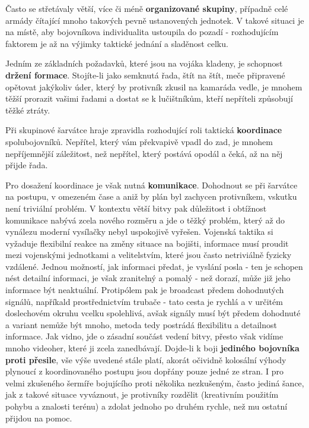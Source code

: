 Často se střetávaly větší, více či méně \textbf{organizované skupiny}, případně celé armády čítající mnoho takových pevně ustanovených jednotek. V takové situaci je na místě, aby bojovníkova individualita ustoupila do pozadí - rozhodujícím faktorem je až na výjimky taktické jednání a sladěnost celku. 

Jedním ze základních požadavků, které jsou na vojáka kladeny, je schopnost \textbf{držení formace}. Stojíte-li jako semknutá řada, štít na štít, meče připravené opětovat jakýkoliv úder, který by protivník zkusil na kamaráda vedle, je mnohem těžší prorazit vašimi řadami a dostat se k lučištníkům, kteří nepříteli způsobují těžké ztráty. 

Při skupinové šarvátce hraje zpravidla rozhodující roli taktická \textbf{koordinace} spolubojovníků. Nepřítel, který vám překvapivě vpadl do zad, je mnohem nepříjemnější záležitost, než nepřítel, který postává opodál a čeká, až na něj přijde řada.  

Pro dosažení koordinace je však nutná \textbf{komunikace}. Dohodnout se při šarvátce na postupu, v omezeném čase a aniž by plán byl zachycen protivníkem, vskutku není triviální problém. V kontextu větší bitvy pak důležitost i obtížnost komunikace nabývá zcela nového rozměru a jde o těžký problém, který až do vynálezu moderní vysílačky nebyl uspokojivě vyřešen. Vojenská taktika si vyžaduje flexibilní reakce na změny situace na bojišti, informace musí proudit mezi vojenskými jednotkami a velitelstvím, které jsou často netriviálně fyzicky vzdálené. Jednou možností, jak informaci předat, je vyslání posla - ten je schopen nést detailní informaci, je však zranitelný a pomalý - než dorazí, může již jeho informace být neaktuální. Protipólem pak je broadcast předem dohodnutých signálů, napříkald prostřednictvím trubače - tato cesta je rychlá a v určitém doslechovém okruhu vcelku spolehlivá, avšak signály musí být předem dohodnuté a variant nemůže být mnoho, metoda tedy postrádá flexibilitu a detailnost informace. Jak vidno, jde o zásadní součást vedení bitvy, přesto však vidíme mnoho videoher, které ji zcela zanedbávají.
\bigbreak
Dojde-li k boji \textbf{jediného bojovníka proti přesile}, vše výše uvedené stále platí, akorát očividně kolosální výhody plynoucí z koordinovaného postupu jsou dopřány pouze jedné ze stran. I pro velmi zkušeného šermíře bojujícího proti několika nezkušeným, často jediná šance, jak z takové situace vyváznout, je protivníky rozdělit (kreativním použitím pohybu a znalosti terénu) a zdolat jednoho po druhém rychle, než mu ostatní přijdou na pomoc.

